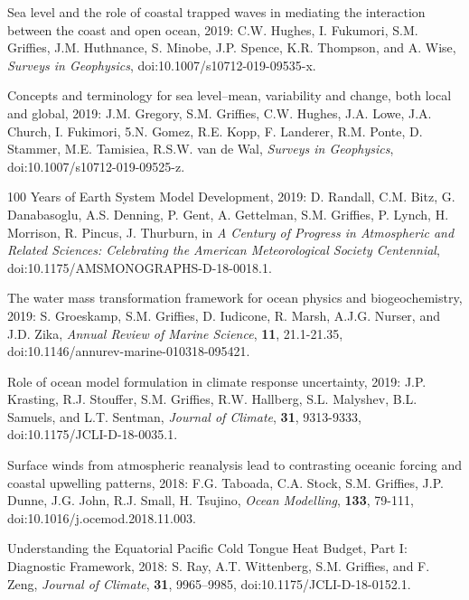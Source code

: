 \begin{etaremune}
\item Sea level and the role of coastal trapped waves in mediating the interaction between the coast and open ocean, 2019: C.W. Hughes, I. Fukumori, S.M. Grif\/f\/ies, J.M. Huthnance, S. Minobe, J.P. Spence, K.R. Thompson, and A. Wise, {\it Surveys in Geophysics}, 
doi:10.1007/s10712-019-09535-x.

\item Concepts and terminology for sea level--mean, variability and change, both local and global, 2019: J.M. Gregory, S.M. Grif\/f\/ies, C.W. Hughes, J.A. Lowe, J.A. Church, I. Fukimori, 5.N. Gomez, R.E. Kopp, F. Landerer, R.M. Ponte, D. Stammer, M.E. Tamisiea, R.S.W. van de Wal, {\it Surveys in Geophysics},
doi:10.1007/s10712-019-09525-z.

\item 100 Years of Earth System Model Development, 2019: D. Randall, C.M. Bitz, G. Danabasoglu, A.S. Denning, P. Gent, A. Gettelman, S.M. Grif\/f\/ies, P. Lynch, H. Morrison, R. Pincus, J. Thurburn, in {\it A Century of Progress in Atmospheric and Related Sciences: Celebrating the American Meteorological Society Centennial}, doi:10.1175/AMSMONOGRAPHS-D-18-0018.1.

\item The water mass transformation framework for ocean physics and biogeochemistry, 2019: S. Groeskamp, S.M. Grif\/f\/ies, D. Iudicone,  R. Marsh, A.J.G. Nurser, and J.D. Zika, {\it Annual Review of Marine Science}, {\bf 11}, 21.1-21.35, doi:10.1146/annurev-marine-010318-095421.

\item Role of ocean model formulation in climate response uncertainty, 2019: J.P. Krasting, R.J. Stouffer, S.M. Grif\/f\/ies, R.W. Hallberg, S.L. Malyshev, B.L. Samuels, and L.T. Sentman, {\it Journal of Climate}, {\bf 31}, 9313-9333, doi:10.1175/JCLI-D-18-0035.1.

\item Surface winds from atmospheric reanalysis lead to contrasting oceanic forcing and coastal upwelling patterns, 2018: F.G. Taboada, C.A. Stock, S.M. Grif\/f\/ies, J.P. Dunne, J.G. John, R.J. Small, H. Tsujino, {\it Ocean Modelling}, {\bf 133}, 79-111, 
doi:10.1016/j.ocemod.2018.11.003.

\item Understanding the Equatorial Pacific Cold Tongue Heat Budget, Part I: Diagnostic Framework, 2018: S. Ray, A.T. Wittenberg, S.M. Grif\/f\/ies, and F. Zeng, {\it Journal of Climate}, {\bf 31}, 9965--9985, doi:10.1175/JCLI-D-18-0152.1. 


\end{etaremune}
